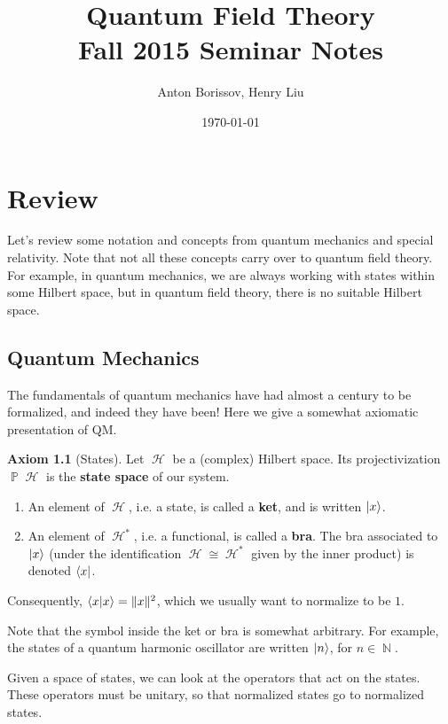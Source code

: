 \documentclass{report}
\title{Quantum Field Theory\\Fall 2015 Seminar Notes}
\author{Anton Borissov, Henry Liu}
\date{\today}
\theoremstyle{plain}
\theoremstyle{definition}
\newtheorem{axiom}{Axiom}
\theoremstyle{remark}
\DeclareMathOperator{\bP}{\mathbb{P}}
\DeclareMathOperator{\bN}{\mathbb{N}}
\DeclareMathOperator{\cH}{\mathcal{H}}
\begin{document}
\maketitle

\tableofcontents

\chapter{Review}

Let's review some notation and concepts from quantum mechanics and
special relativity. Note that not all these concepts carry over to
quantum field theory. For example, in quantum mechanics, we are always
working with states within some Hilbert space, but in quantum field
theory, there is no suitable Hilbert space.

\section{Quantum Mechanics}

The fundamentals of quantum mechanics have had almost a century to be
formalized, and indeed they have been! Here we give a somewhat
axiomatic presentation of QM.

\begin{axiom}[States]
  Let $\cH$ be a (complex) Hilbert space. Its projectivization
  $\bP\cH$ is the {\bf state space} of our system.
  \begin{enumerate}
  \item An element of $\cH$, i.e. a state, is called a {\bf ket}, and
    is written $\ket{x}$.
  \item An element of $\cH^*$, i.e. a functional, is called a {\bf
      bra}. The bra associated to $\ket{x}$ (under the identification
    $\cH \cong \cH^*$ given by the inner product) is denoted $\bra{x}$.
  \end{enumerate}
  Consequently, $\braket{x|x} = \|x\|^2$, which we usually want to
  normalize to be $1$.

  Note that the symbol inside the ket or bra is somewhat arbitrary.
  For example, the states of a quantum harmonic oscillator are written
  $\ket{n}$, for $n \in \bN$.
\end{axiom}

Given a space of states, we can look at the operators that act on the
states. These operators must be unitary, so that normalized states go
to normalized states. 
\end{document}
